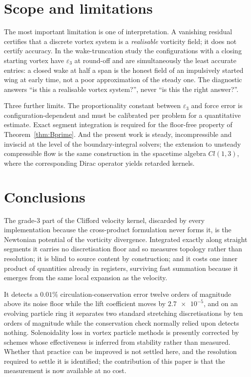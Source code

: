 \documentclass[preprint,12pt,3p]{elsarticle}
\theoremstyle{remark}
\newcommand{\eps}{\varepsilon_3}
\begin{document}
\section{Scope and limitations}
\label{sec:scope}

The most important limitation is one of interpretation. A vanishing residual
certifies that a discrete vortex system is a \emph{realisable} vorticity field;
it does not certify accuracy. In the wake-truncation study the configurations
with a closing starting vortex have $\eps$ at round-off and are simultaneously
the least accurate entries: a closed wake at half a span is the honest field of
an impulsively started wing at early time, not a poor approximation of the
steady one. The diagnostic answers ``is this a realisable vortex system?'',
never ``is this the right answer?''.

Three further limits. The proportionality constant between $\eps$ and force
error is configuration-dependent and must be calibrated per problem for a
quantitative estimate. Exact segment integration is required for the floor-free
property of Theorem~\ref{thm:Bprime}. And the present work is steady,
incompressible and inviscid at the level of the boundary-integral solvers; the
extension to unsteady compressible flow is the same construction in the
spacetime algebra $Cl(1,3)$, where the corresponding Dirac operator yields
retarded kernels.

\section{Conclusions}

The grade-3 part of the Clifford velocity kernel, discarded by every
implementation because the cross-product formulation never forms it, is the
Newtonian potential of the vorticity divergence. Integrated exactly along
straight segments it carries no discretisation floor and so measures topology
rather than resolution; it is blind to source content by construction; and it
costs one inner product of quantities already in registers, surviving fast
summation because it emerges from the same local expansion as the velocity.

It detects a $0.01\%$ circulation-conservation error twelve orders of magnitude
above its noise floor while the lift coefficient moves by $\num{2.7e-5}$, and on
an evolving particle ring it separates two standard stretching discretisations
by ten orders of magnitude while the conservation check normally relied upon
detects nothing. Solenoidality loss in vortex particle methods is presently
corrected by schemes whose effectiveness is inferred from stability rather than
measured. Whether that practice can be improved is not settled here, and the
resolution required to settle it is identified; the contribution of this paper
is that the measurement is now available at no cost.
\end{document}
